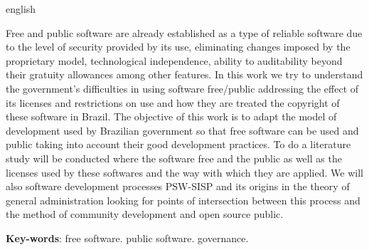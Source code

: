 \begin{resumo}[Abstract]
 \begin{otherlanguage*}{english}
   
Free and public software are already established as a type of reliable software
due to the level of security provided by its use, eliminating changes
imposed by the proprietary model, technological independence, ability to
auditability beyond their gratuity allowances among other features.
%
In this work we try to understand the government's difficulties in using software
free/public addressing the effect of its licenses and restrictions on use and how they are
treated the copyright of these software in Brazil.
%
The objective of this work is to adapt the model of development used by
Brazilian government so that free software can be used and public
taking into account their good development practices.
%
To do a literature study will be conducted where the software
free and the public as well as the licenses used by these softwares and the way
with which they are applied. We will also software development processes
PSW-SISP and its origins in the theory of general administration looking for points of intersection
between this process and the method of community development and open source
public.

   \vspace{\onelineskip}
 
   \noindent 
   \textbf{Key-words}: free software. public software. governance.
 \end{otherlanguage*}
\end{resumo}
